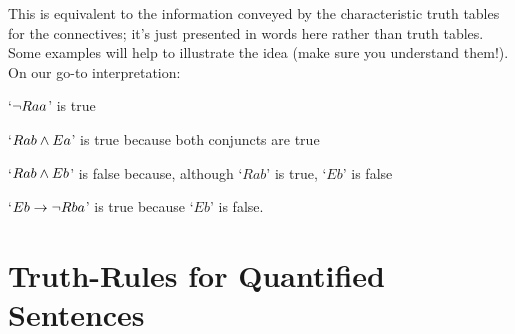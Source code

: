 This  is equivalent to the information conveyed by the characteristic truth tables for the connectives; it's just presented in words here rather than truth tables.   Some examples will help to illustrate the idea (make sure you understand them!). On our go-to interpretation:
	\begin{earg}
		\item[\textbullet]  `$\neg Raa$' is true
		\item[\textbullet] `$Rab \wedge Ea$' is true because both conjuncts are true
		\item[\textbullet] `$Rab \wedge Eb$' is false because, although `$Rab$' is true, `$Eb$' is false
		\item[\textbullet] `$Eb \rightarrow \neg Rba$' is true because `$Eb$' is false.
		\end{earg}

\section{Truth-Rules for Quantified Sentences}\label{s:TruthQuantifiedSentences}

